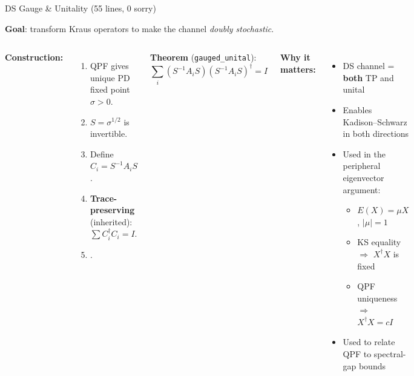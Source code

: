 \documentclass[aspectratio=169,10pt]{beamer}
\begin{document}
\begin{frame}{DS Gauge \& Unitality \textcolor{leangreen}{(55 lines, 0 sorry)}}
    \vspace{-0.5em}

    \textbf{Goal}: transform Kraus operators to make the channel \emph{doubly stochastic}.

    \vspace{0.15em}
    \begin{columns}[T]
        \textbf{Construction:}
        \begin{enumerate}\itemsep0.1em\small
            \item QPF gives unique PD fixed point $\sigma > 0$.
            \item $S = \sigma^{1/2}$ is invertible.
            \item Define $C_i = S^{-1} A_i S$.
            \item \textbf{Trace-preserving} (inherited):
                $\sum C_i^\dagger C_i = I$.
            \item {}.
        \end{enumerate}

        \vspace{0.2em}
        \textbf{\textcolor{leangreen}{Theorem}} (\texttt{gauged\_unital}):
        {\small
        \[
            \sum_{i} (S^{-1}A_i S)(S^{-1}A_i S)^\dagger = I
        \]}

        \textbf{Why it matters:}
        \begin{itemize}\itemsep0.1em\small
            \item DS channel = \textbf{both} TP and unital
            \item Enables Kadison--Schwarz in both directions
            \item Used in the peripheral eigenvector argument:
            \begin{itemize}\scriptsize
                \item $E(X) = \mu X$, $|\mu| = 1$
                \item KS equality $\Rightarrow$ $X^\dagger X$ is fixed
                \item QPF uniqueness $\Rightarrow$ $X^\dagger X = cI$
            \end{itemize}
            \item Used to relate QPF to spectral-gap bounds
        \end{itemize}
    \end{columns}


\end{frame}
\end{document}
